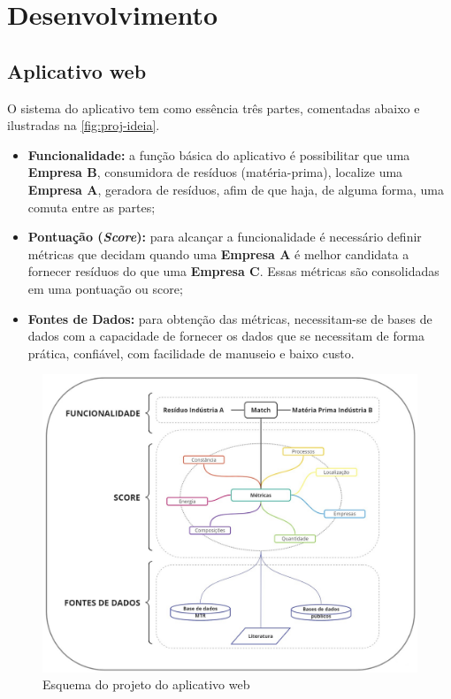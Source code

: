 \chapter{Desenvolvimento}

\section{Aplicativo web}

O sistema do aplicativo tem como essência três partes, comentadas abaixo e ilustradas na \autoref{fig:proj-ideia}.

\begin{itemize} 
	\item \textbf{Funcionalidade:} a função básica do aplicativo é possibilitar que uma \textbf{Empresa B}, consumidora de resíduos (matéria-prima), localize uma \textbf{Empresa A}, geradora de resíduos, afim de que haja, de alguma forma, uma comuta entre as partes;
	\item \textbf{Pontuação (\textit{Score}):} para alcançar a funcionalidade é necessário definir métricas que decidam quando uma \textbf{Empresa A} é melhor candidata a fornecer resíduos do que uma \textbf{Empresa C}. Essas métricas são consolidadas em uma pontuação ou score; 
	\item \textbf{Fontes de Dados:} para obtenção das métricas, necessitam-se de bases de dados com a capacidade de fornecer os dados que se necessitam de forma prática, confiável, com facilidade de manuseio e baixo custo.
\end{itemize}

\begin{figure}[htb]
	\caption{\label{fig:proj-ideia} Esquema do projeto do aplicativo web}
	\begin{center}
		\includegraphics[scale=0.48]{images/TCC Board.jpg}
	\end{center}
\end{figure}

